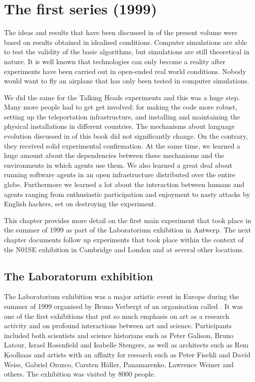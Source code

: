 \chapter{The first series (1999)}
\label{c:first-series}

The ideas and results that have been discussed in  of the present volume 
were based on results obtained in idealised conditions. Computer simulations are able to 
test the validity of the basic algorithms, but simulations are still theoretical in nature. 
It is well known that technologies can only become a reality after 
experiments have been carried out in open-ended real world conditions. Nobody would want to fly an airplane that 
has only been tested in computer simulations. 

We did the same for the Talking Heads experiments and this was a huge step. Many more people had to get
get involved: for making the code more robust, setting up the teleportation infrastructure, and installing and 
maintaining the physical installations in different countries.  
The mechanisms about language evolution discussed in  of this book did not significantly change. On the contrary, 
they received solid experimental confirmation. At the same time, we learned a huge amount about the dependencies
between these mechanisms and the environments in which agents use them. We also learned a great deal about running software 
agents in an open infrastructure distributed over the entire globe. Furthermore we learned a lot 
about the interaction between humans and agents ranging from 
enthusiastic participation and enjoyment to nasty attacks by English hackers, set on destroying the experiment. 

This chapter provides more detail on the first main experiment that took place in the summer of 1999 as 
part of the Laboratorium exhibition in Antwerp. The next chapter documents follow up experiments that took place
within the context of the N01SE exhibition in Cambridge and London and at several other locations. 

\section{The Laboratorum exhibition} 

The Laboratorium
exhibition was a major artistic event in Europe during the summer of 1999 organised by 
Bruno Verbergt of an organisation called .
It was one of the first exhibitions that put so much emphasis on art as a research 
activity and on profound interactions between art and science.
Participants included both scientists and science historians such as Peter Galison, Bruno Latour, Israel Rosenfield
and Isabelle Stengers, as well as architects such as Rem Koolhaas and artists with an affinity for research 
such as Peter Fischli and David Weiss, Gabriel Orozco, Carsten H\"oller, Panamarenko, Lawrence Weiner and others. 
The exhibition was visited by 8000 people. 

